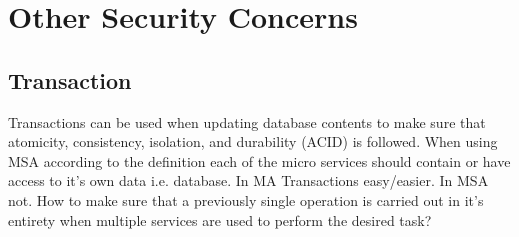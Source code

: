 

\section{Other Security Concerns}
\subsection{Transaction}
\begin{sloppypar}
    Transactions can be used when updating database contents to make sure that
    atomicity, consistency, isolation, and durability (ACID) \citep{acid} is
    followed. When using MSA according to the definition each of the micro
    services should contain or have access to it's own data i.e. database. In MA
    Transactions easy/easier. In MSA not. How to make sure that a previously
    single operation is carried out in it's entirety when multiple services are
    used to perform the desired task?
\end{sloppypar}

